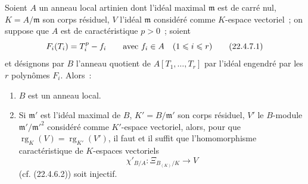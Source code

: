 \begin{proposition}[22.4.7]
\label{0.22.4.7-fr}
Soient $A$ un anneau local artinien dont l'idéal maximal $\mathfrak m$ est de
carré nul, $K=A/\mathfrak m$ son corps résiduel, $V$ l'idéal $\mathfrak m$
considéré comme $K$-espace vectoriel~; on suppose que $A$ est de
caractéristique $p>0$~; soient
\begin{equation}
\label{0.22.4.7.1-fr}
  F_i(T_i)=T_i^p- f_i\qquad\text{avec }f_i\in A\quad(1\leqslant i\leqslant r)
  \tag{22.4.7.1}
\end{equation}
et désignons par $B$ l'anneau quotient de $A[T_1,\ldots,T_r]$ par l'idéal
engendré par les $r$ polynômes $F_i$. Alors~:
\begin{enumerate}
  \item[\rm(i)] $B$ est un anneau local.
  \item[\rm(ii)] Si $\mathfrak m'$ est l'idéal maximal de $B$,
  $K'=B/\mathfrak m'$ son corps résiduel, $V'$ le $B$-module
  $\mathfrak m'/\mathfrak m'^2$ considéré comme $K'$-espace vectoriel, alors,
  pour que $\operatorname{rg}_K(V)=\operatorname{rg}_{K'}(V')$, il faut et il suffit que l'homomorphisme
  caractéristique de $K$-espaces vectoriels
  \begin{equation}
  \label{0.22.4.7.2-fr}
    \chi'_{B/A}:\Xi_{B_{(K)}/K}\longrightarrow V
    \tag{22.4.7.2}
  \end{equation}
  \textup{(cf. (22.4.6.2))} soit injectif.
\end{enumerate}
\end{proposition}

